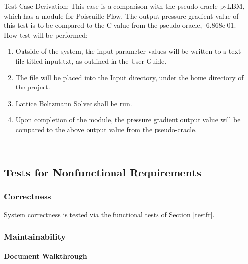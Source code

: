\documentclass[12pt, titlepage]{article}
\newcommand{\famname}{Lattice Boltzmann Solver}
\begin{document}
\begin{enumerate}
Test Case Derivation: This case is a comparison with the pseudo-oracle pyLBM,
which has a module for Poiseuille Flow. The output pressure gradient value of
this test is to be compared to the C value from the pseudo-oracle,
-6.868e-01.\\
					
How test will be performed: 

\begin{enumerate}
\item Outside of the system, the input parameter values will be written to a text file titled input.txt, as outlined in the User Guide.
\item The file will be placed into the Input directory, under the home directory
of the project.
\item {\famname} shall be run.
\item Upon completion of the module, the pressure gradient output value will be
compared to the above output value from the pseudo-oracle.
\end{enumerate}	

\end{enumerate}

~\newpage

\subsection{Tests for Nonfunctional Requirements}
\label{nfrtest}

\subsubsection{Correctness} \label{CorrectnessTest}

System correctness is tested via the functional tests of Section \ref{testfr}.

\subsubsection{Maintainability}
		
\paragraph{Document Walkthrough}
\end{document}
